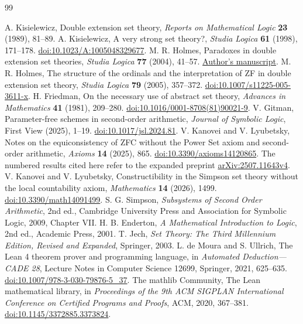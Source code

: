 \documentclass[11pt,a4paper]{article}
\numberwithin{equation}{section}
\theoremstyle{definition}
\theoremstyle{remark}
\begin{document}
\begin{thebibliography}{99}
\small
\raggedright
\setlength{\itemsep}{0pt}
 A. Kisielewicz, Double extension set theory, \emph{Reports on Mathematical Logic} \textbf{23} (1989), 81--89.
 A. Kisielewicz, A very strong set theory?, \emph{Studia Logica} \textbf{61} (1998), 171--178. \href{https://doi.org/10.1023/A:1005048329677}{doi:10.1023/A:1005048329677}.
 M. R. Holmes, Paradoxes in double extension set theories, \emph{Studia Logica} \textbf{77} (2004), 41--57. \href{https://randall-holmes.github.io/Papers/nodouble.pdf}{Author's manuscript}.
 M. R. Holmes, The structure of the ordinals and the interpretation of ZF in double extension set theory, \emph{Studia Logica} \textbf{79} (2005), 357--372. \href{https://doi.org/10.1007/s11225-005-3611-x}{doi:10.1007/s11225-005-3611-x}.
 H. Friedman, On the necessary use of abstract set theory, \emph{Advances in Mathematics} \textbf{41} (1981), 209--280. \href{https://doi.org/10.1016/0001-8708(81)90021-9}{doi:10.1016/0001-8708(81)90021-9}.
 V. Gitman, Parameter-free schemes in second-order arithmetic, \emph{Journal of Symbolic Logic}, First View (2025), 1--19. \href{https://doi.org/10.1017/jsl.2024.81}{doi:10.1017/jsl.2024.81}.
 V. Kanovei and V. Lyubetsky, Notes on the equiconsistency of ZFC without the Power Set axiom and second-order arithmetic, \emph{Axioms} \textbf{14} (2025), 865. \href{https://doi.org/10.3390/axioms14120865}{doi:10.3390/axioms14120865}. The numbered results cited here refer to the expanded preprint \href{https://arxiv.org/abs/2507.11643v4}{arXiv:2507.11643v4}.
 V. Kanovei and V. Lyubetsky, Constructibility in the Simpson set theory without the local countability axiom, \emph{Mathematics} \textbf{14} (2026), 1499. \href{https://doi.org/10.3390/math14091499}{doi:10.3390/math14091499}.
 S. G. Simpson, \emph{Subsystems of Second Order Arithmetic}, 2nd ed., Cambridge University Press and Association for Symbolic Logic, 2009, Chapter VII.
 H. B. Enderton, \emph{A Mathematical Introduction to Logic}, 2nd ed., Academic Press, 2001.
 T. Jech, \emph{Set Theory: The Third Millennium Edition, Revised and Expanded}, Springer, 2003.
 L. de Moura and S. Ullrich, The Lean 4 theorem prover and programming language, in \emph{Automated Deduction---CADE 28}, Lecture Notes in Computer Science 12699, Springer, 2021, 625--635. \href{https://doi.org/10.1007/978-3-030-79876-5_37}{doi:10.1007/978-3-030-79876-5\_37}.
 The mathlib Community, The Lean mathematical library, in \emph{Proceedings of the 9th ACM SIGPLAN International Conference on Certified Programs and Proofs}, ACM, 2020, 367--381. \href{https://doi.org/10.1145/3372885.3373824}{doi:10.1145/3372885.3373824}.
\end{thebibliography}
\end{document}
